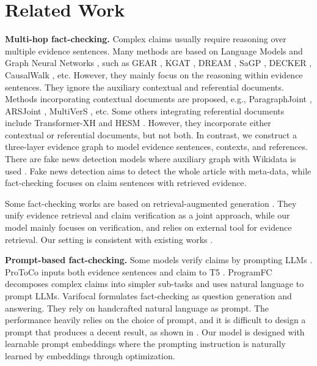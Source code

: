 \section{Related Work}
\textbf{Multi-hop fact-checking.} Complex claims usually require reasoning over multiple evidence sentences. Many methods are based on Language Models \cite{transformer,bert} and Graph Neural Networks \cite{graphsage}, such as GEAR \cite{gear}, KGAT \cite{kgat}, DREAM \cite{dream}, SaGP \cite{sagp}, DECKER \cite{decker}, CausalWalk \cite{causalwalk}, etc. However, they mainly focus on the reasoning within evidence sentences. They ignore the auxiliary contextual and referential documents. Methods incorporating contextual documents are proposed, e.g., ParagraphJoint \cite{paragraphjoint}, ARSJoint \cite{arsjoint}, MultiVerS \cite{multivers}, etc. Some others integrating referential documents include Transformer-XH \cite{transformer_xh} and HESM \cite{hesm}. However, they incorporate either contextual or referential documents, but not both. In contrast, we construct a three-layer evidence graph to model evidence sentences, contexts, and references. There are fake news detection models where auxiliary graph with Wikidata is used \cite{fake_news_detection,fake_news_detection2}. Fake news detection aims to detect the whole article with meta-data, while fact-checking focuses on claim sentences with retrieved evidence.

Some fact-checking works are based on retrieval-augmented generation \cite{justilm}. They unify evidence retrieval and claim verification as a joint approach, while our model mainly focuses on verification, and relies on external tool for evidence retrieval. Our setting is consistent with existing works \cite{multivers,causalwalk}.

\textbf{Prompt-based fact-checking.} Some models verify claims by prompting LLMs \cite{gpt4}. ProToCo \cite{protoco} inputs both evidence sentences and claim to T5 \cite{t5}. ProgramFC \cite{programfc} decomposes complex claims into simpler sub-tasks and uses natural language to prompt LLMs. Varifocal \cite{varifocal} formulates fact-checking as question generation and answering. They rely on handcrafted natural language as prompt. The performance heavily relies on the choice of prompt, and it is difficult to design a prompt that produces a decent result, as shown in \cite{coop}. Our model is designed with learnable prompt embeddings where the prompting instruction is naturally learned by embeddings through optimization.

